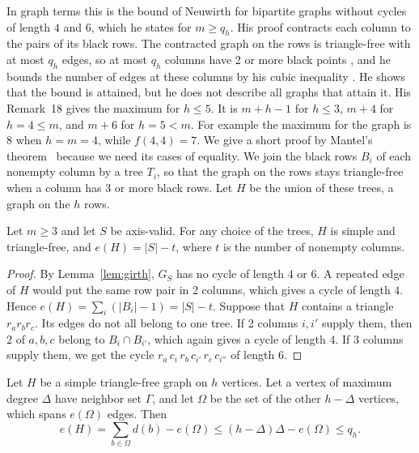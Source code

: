 In graph terms this is the bound of Neuwirth \cite[Theorem~1(ii) and
Proposition~17]{neuwirth2001} for bipartite graphs without cycles of length $4$ and $6$,
which he states for $m\ge q_h$. His proof contracts each column to the pairs of its black
rows. The contracted graph on the rows is triangle-free with at most $q_h$ edges, so at
most $q_h$ columns have 2 or more black points \cite[Proposition~3]{neuwirth2001}, and he
bounds the number of edges at these columns by his cubic inequality
\cite[Theorem~1(i)]{neuwirth2001}. He shows that the bound is attained, but he does not
describe all graphs that attain it. His Remark~18 gives the maximum for $h\le5$. It is
$m+h-1$ for $h\le3$, $m+4$ for $h=4\le m$, and $m+6$ for $h=5<m$. For example the maximum
for the graph is $8$ when $h=m=4$, while $f(4,4)=7$. We give a short proof by Mantel's
theorem~\cite{mantel1907} because we need its cases of equality. We join the black rows
$B_i$ of each nonempty column by a tree $T_i$, so that the graph on the rows stays
triangle-free when a column has 3 or more black rows. Let $H$ be the union of these trees,
a graph on the $h$ rows.

\begin{lemma}\label{lem:H}
Let $m\ge3$ and let $S$ be axis-valid. For any choice of the trees, $H$ is simple and
triangle-free, and $e(H)=|S|-t$, where $t$ is the number of nonempty columns.
\end{lemma}

\begin{proof}
By Lemma~\ref{lem:girth}, $G_S$ has no cycle of length $4$ or $6$. A repeated edge of $H$
would put the same row pair in 2 columns, which gives a cycle of length $4$. Hence
$e(H)=\sum_i(|B_i|-1)=|S|-t$. Suppose that $H$ contains a triangle $r_ar_br_c$. Its edges
do not all belong to one tree. If 2 columns $i,i'$ supply them, then 2 of $a,b,c$ belong to
$B_i\cap B_{i'}$, which again gives a cycle of length $4$. If 3 columns supply them, we get
the cycle $r_a\,c_i\,r_b\,c_{i'}\,r_c\,c_{i''}$ of length $6$.
\end{proof}

\begin{lemma}[Mantel]\label{lem:mantel}
Let $H$ be a simple triangle-free graph on $h$ vertices. Let a vertex of maximum degree
$\Delta$ have neighbor set $\Gamma$, and let $\Omega$ be the set of the other $h-\Delta$
vertices, which spans $e(\Omega)$ edges. Then
\[
e(H)=\sum_{b\in\Omega}d(b)-e(\Omega)\le(h-\Delta)\Delta-e(\Omega)\le q_h.
\]
\end{lemma}

